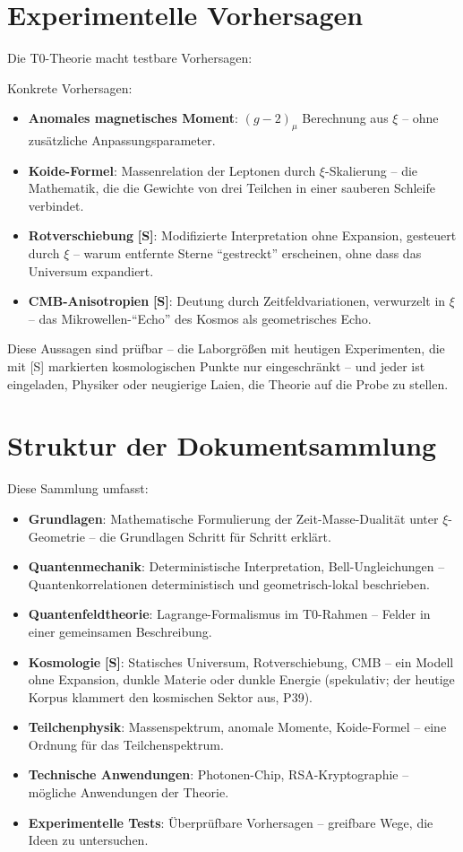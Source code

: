 	\section{Experimentelle Vorhersagen}
	Die T0-Theorie macht testbare Vorhersagen:
	
	\begin{foundation}
		Konkrete Vorhersagen:
		\begin{itemize}
			\item \textbf{Anomales magnetisches Moment}: $(g-2)_\mu$ Berechnung aus $\xi$ – ohne zusätzliche Anpassungsparameter.
			\item \textbf{Koide-Formel}: Massenrelation der Leptonen durch $\xi$-Skalierung – die Mathematik, die die Gewichte von drei Teilchen in einer sauberen Schleife verbindet.
			\item \textbf{Rotverschiebung} \textbf{[S]}: Modifizierte Interpretation ohne Expansion, gesteuert durch $\xi$ – warum entfernte Sterne ``gestreckt'' erscheinen, ohne dass das Universum expandiert.
			\item \textbf{CMB-Anisotropien} \textbf{[S]}: Deutung durch Zeitfeldvariationen, verwurzelt in $\xi$ – das Mikrowellen-``Echo'' des Kosmos als geometrisches Echo.
		\end{itemize}
	\end{foundation}
	
	Diese Aussagen sind prüfbar – die Laborgrößen mit heutigen Experimenten, die mit [S] markierten kosmologischen Punkte nur eingeschränkt – und jeder ist eingeladen, Physiker oder neugierige Laien, die Theorie auf die Probe zu stellen.
	
	\section{Struktur der Dokumentsammlung}
	Diese Sammlung umfasst:
	\begin{itemize}
		\item \textbf{Grundlagen}: Mathematische Formulierung der Zeit-Masse-Dualität unter $\xi$-Geometrie – die Grundlagen Schritt für Schritt erklärt.
		\item \textbf{Quantenmechanik}: Deterministische Interpretation, Bell-Ungleichungen – Quantenkorrelationen deterministisch und geometrisch-lokal beschrieben.
		\item \textbf{Quantenfeldtheorie}: Lagrange-Formalismus im T0-Rahmen – Felder in einer gemeinsamen Beschreibung.
		\item \textbf{Kosmologie} \textbf{[S]}: Statisches Universum, Rotverschiebung, CMB – ein Modell ohne Expansion, dunkle Materie oder dunkle Energie (spekulativ; der heutige Korpus klammert den kosmischen Sektor aus, P39).
		\item \textbf{Teilchenphysik}: Massenspektrum, anomale Momente, Koide-Formel – eine Ordnung für das Teilchenspektrum.
		\item \textbf{Technische Anwendungen}: Photonen-Chip, RSA-Kryptographie – mögliche Anwendungen der Theorie.
		\item \textbf{Experimentelle Tests}: Überprüfbare Vorhersagen – greifbare Wege, die Ideen zu untersuchen.
	\end{itemize}
	

